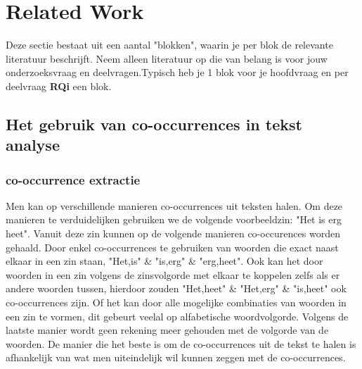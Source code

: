 \section{Related Work}
\label{sec:rel}



Deze sectie bestaat uit een aantal "blokken", waarin je per blok de relevante literatuur beschrijft. Neem alleen literatuur op die van belang is voor jouw onderzoeksvraag en deelvragen.Typisch heb je 1 blok voor je hoofdvraag en per deelvraag \textbf{RQi} een blok. 

\subsection{Het gebruik van co-occurrences in tekst analyse}

\subsubsection{co-occurrence extractie}
Men kan op verschillende manieren co-occurrences uit teksten halen. Om deze manieren te verduidelijken gebruiken we de volgende voorbeeldzin: "Het is erg heet". Vanuit deze zin kunnen op de volgende manieren co-occurences worden gehaald. Door enkel co-occurrences te gebruiken van woorden die exact naast elkaar in een zin staan, "Het,is" \& "is,erg" \& "erg,heet". Ook kan het door woorden in een zin volgens de zinsvolgorde met elkaar te koppelen zelfs als er andere woorden tussen, hierdoor zouden "Het,heet" \& "Het,erg" \& "is,heet" ook co-occurrences zijn. Of het kan door alle mogelijke combinaties van woorden in een zin te vormen, dit gebeurt veelal op alfabetische woordvolgorde. Volgens de laatste manier wordt geen rekening meer gehouden met de volgorde van de woorden. De manier die het beste is om de co-occurrences uit de tekst te halen is afhankelijk van wat men uiteindelijk wil kunnen zeggen met de co-occurrences. \citep{shimohata1997retrieving}

